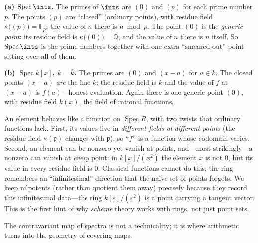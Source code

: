 \documentclass[11pt]{article}
\DeclareMathOperator{\Spec}{Spec}
\newcommand{\mfp}{\mathfrak{p}}
\begin{document}
\begin{eexample}
\textbf{(a) $\Spec\ints$.} The primes of $\ints$ are $(0)$ and $(p)$ for each prime number
$p$. The points $(p)$ are ``closed'' (ordinary points), with residue field
$\kappa\big((p)\big)=\mathbb{F}_p$; the value of $n$ there is $n\bmod p$. The point $(0)$ is
the \emph{generic point}: its residue field is $\kappa\big((0)\big)=\mathbb{Q}$, and the
value of $n$ there is $n$ itself. So $\Spec\ints$ is the prime numbers together with one
extra ``smeared-out'' point sitting over all of them.

\textbf{(b) $\Spec k[x]$, $k=\bar k$.} The primes are $(0)$ and $(x-a)$ for $a\in k$. The
closed points $(x-a)$ \emph{are} the line $k$; the residue field is $k$ and the value of $f$
at $(x-a)$ is $f(a)$---honest evaluation. Again there is one generic point $(0)$, with
residue field $k(x)$, the field of rational functions.
\end{eexample}

\begin{iintuition}
An element behaves like a function on $\Spec R$, with two twists that ordinary functions
lack. First, its values live in \emph{different fields at different points} (the residue
field $\kappa(\mfp)$ changes with $\mfp$), so ``$f$'' is a function whose codomain varies.
Second, an element can be nonzero yet vanish at points, and---most strikingly---a nonzero
 can vanish at \emph{every} point: in $k[x]/(x^2)$ the element $x$ is not
$0$, but its value in every residue field is $0$. Classical functions cannot do this; the
ring remembers an ``infinitesimal'' direction that the naive set of points forgets. We keep
nilpotents (rather than quotient them away) precisely because they record this
infinitesimal data---the ring $k[\varepsilon]/(\varepsilon^2)$ is a point carrying a tangent
vector. This is the first hint of why \emph{scheme} theory works with rings, not just point
sets.
\end{iintuition}

The contravariant map of spectra is not a technicality; it is where arithmetic turns into the
geometry of covering maps.
\end{document}
